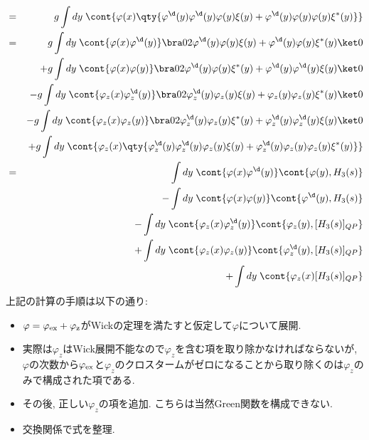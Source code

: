 \documentclass[10.5pt,a4paper]{jreport}
\begin{document}
\begin{eqnarray}
  &=& g \int d{y}\; \cont{ \varphi(x)\qty{ \varphi^\d(y)\varphi^\d(y)\varphi(y)\xi(y) + \varphi^\d(y)\varphi(y)\varphi(y)\xi^*(y) } } \\
  &=& g\int d{y}\; \cont{\varphi(x)\varphi^\d(y)} \bra0 2\varphi^\d(y)\varphi(y)\xi(y) + \varphi^\d(y)\varphi(y)\xi^*(y) \ket0 \notag\\
  &&+ g\int d{y}\; \cont{\varphi(x)\varphi(y)} \bra0 2\varphi^\d(y)\varphi(y)\xi^*(y) + \varphi^\d(y)\varphi^\d(y)\xi(y) \ket0 \notag\\	
  &&- g\int d{y}\; \cont{\varphi_{z}(x)\varphi_{z}^\d(y)} 
  \bra0 2\varphi_{z}^\d(y)\varphi_{z}(y)\xi(y) + \varphi_{z}(y)\varphi_{z}(y)\xi^*(y) \ket0 \notag\\
  &&- g\int d{y}\; \cont{\varphi_{z}(x)\varphi_{z}(y)} 
  \bra0 2\varphi_{z}^\d(y)\varphi_{z}(y)\xi^*(y) + \varphi_{z}^\d(y)\varphi_{z}^\d(y)\xi(y) \ket0 \notag\\
  &&+ g\int d{y}\; \cont{\varphi_{z}(x)\qty{ \varphi_{z}^\d(y)\varphi_{z}^\d(y)\varphi_{z}(y)\xi(y) 
      + \varphi_{z}^\d(y)\varphi_{z}(y)\varphi_{z}(y)\xi^*(y) }} \\
  &=& \int d{y}\; \cont{\varphi(x)\varphi^\d(y)} \cont{\varphi(y) , H_3(s)} \notag\\
  &&- \int d{y}\; \cont{\varphi(x)\varphi(y)} \cont{\varphi^\d(y) , H_3(s)} \notag\\
  &&- \int d{y}\; \cont{\varphi_{z}(x)\varphi_{z}^\d(y)} \cont{\varphi_{z}(y) , [H_3(s)]_{QP}} \notag\\
  &&+ \int d{y}\; \cont{\varphi_{z}(x)\varphi_{z}(y)} \cont{\varphi^\d_{z}(y) , [H_3(s)]_{QP}} \notag\\	
  &&+ \int d{y}\; \cont{\varphi_{z}(x) [H_3(s)]_{QP}} 
\end{eqnarray}
上記の計算の手順は以下の通り:
\begin{itemize}
\item $\varphi = \varphi_{\rm ex} + \varphi_{\rm z}$がWickの定理を満たすと仮定して$\varphi$について展開.
\item 実際は$\varphi_z$はWick展開不能なので$\varphi_z$を含む項を取り除かなければならないが, $\varphi$の次数から$\varphi_{\rm ex}$と$\varphi_{z}$のクロスタームがゼロになることから取り除くのは$\varphi_z$のみで構成された項である.
\item その後, 正しい$\varphi_z$の項を追加. こちらは当然Green関数を構成できない.
\item 交換関係で式を整理. 
\end{itemize}
\end{document}

